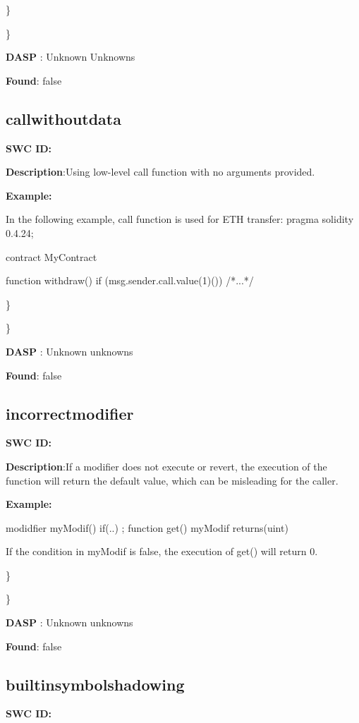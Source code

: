 \documentclass{article}
\begin{document}
\} 

\} 

\textbf{DASP} : Unknown Unknowns

\textbf{Found}: false

\subsection{call\textunderscore without\textunderscore data} 
\textbf{SWC \textunderscore ID:} 

\textbf{Description}:Using low-level call function with no arguments provided.


\textbf{Example:} 

In the following example, call function is used for ETH transfer:
pragma solidity 0.4.24;

contract MyContract {

    function withdraw() {
        if (msg.sender.call.value(1)()) {
        /*...*/
        }
    }
}

\} 

\} 

\textbf{DASP} : Unknown unknowns

\textbf{Found}: false

\subsection{incorrect\textunderscore modifier} 
\textbf{SWC \textunderscore ID:} 

\textbf{Description}:If a modifier does not execute \textunderscore  or revert, the execution of the function will return the default value, which can be misleading for the caller.


\textbf{Example:} 

modidfier myModif(){
    if(..){
      \textunderscore ;
    }
}
function get() myModif returns(uint){}

If the condition in myModif is false, the execution of get() will return 0.

\} 

\} 

\textbf{DASP} : Unknown unknowns

\textbf{Found}: false

\subsection{builtin\textunderscore symbol\textunderscore shadowing} 
\textbf{SWC \textunderscore ID:} 
\end{document}
